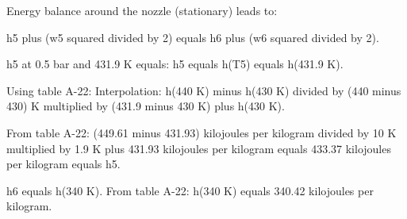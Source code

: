 Energy balance around the nozzle (stationary) leads to:  

h5 plus (w5 squared divided by 2) equals h6 plus (w6 squared divided by 2).  

h5 at 0.5 bar and 431.9 K equals:  
h5 equals h(T5) equals h(431.9 K).  

Using table A-22:  
Interpolation:  
h(440 K) minus h(430 K) divided by (440 minus 430) K multiplied by (431.9 minus 430 K) plus h(430 K).  

From table A-22:  
(449.61 minus 431.93) kilojoules per kilogram divided by 10 K multiplied by 1.9 K plus 431.93 kilojoules per kilogram equals 433.37 kilojoules per kilogram equals h5.  

h6 equals h(340 K).  
From table A-22:  
h(340 K) equals 340.42 kilojoules per kilogram.